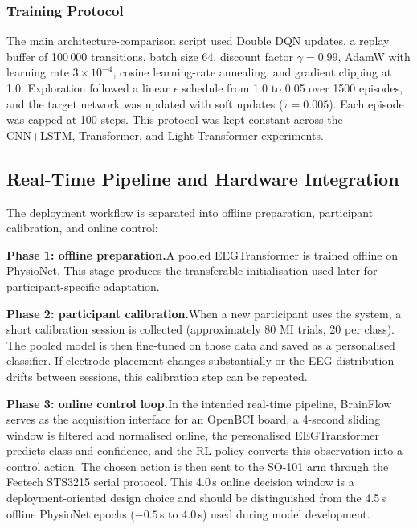 \documentclass[12pt, a4paper]{article}
\begin{document}
\subsubsection{Training Protocol}

The main architecture-comparison script used Double DQN updates, a replay buffer of 100\,000 transitions, batch size 64, discount factor $\gamma = 0.99$, AdamW with learning rate $3 \times 10^{-4}$, cosine learning-rate annealing, and gradient clipping at 1.0. Exploration followed a linear $\epsilon$ schedule from 1.0 to 0.05 over 1500 episodes, and the target network was updated with soft updates ($\tau = 0.005$). Each episode was capped at 100 steps. This protocol was kept constant across the CNN+LSTM, Transformer, and Light Transformer experiments.

\subsection{Real-Time Pipeline and Hardware Integration}

The deployment workflow is separated into offline preparation, participant calibration, and online control:

\textbf{Phase 1: offline preparation.}\quad A pooled EEGTransformer is trained offline on PhysioNet. This stage produces the transferable initialisation used later for participant-specific adaptation.

\textbf{Phase 2: participant calibration.}\quad When a new participant uses the system, a short calibration session is collected (approximately 80 MI trials, 20 per class). The pooled model is then fine-tuned on those data and saved as a personalised classifier. If electrode placement changes substantially or the EEG distribution drifts between sessions, this calibration step can be repeated.

\textbf{Phase 3: online control loop.}\quad In the intended real-time pipeline, BrainFlow serves as the acquisition interface for an OpenBCI board, a 4-second sliding window is filtered and normalised online, the personalised EEGTransformer predicts class and confidence, and the RL policy converts this observation into a control action. The chosen action is then sent to the SO-101 arm through the Feetech STS3215 serial protocol. This 4.0\,s online decision window is a deployment-oriented design choice and should be distinguished from the 4.5\,s offline PhysioNet epochs ($-0.5$\,s to $4.0$\,s) used during model development.
\end{document}
